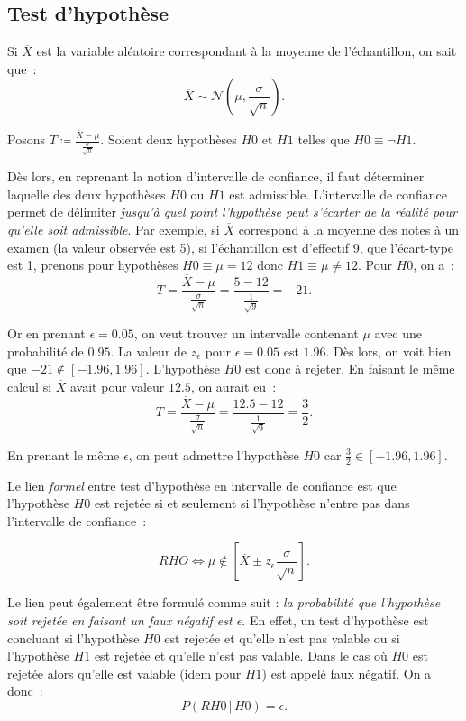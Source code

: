\documentclass{article}
\begin{document}
	\subsection{Test d'hypothèse}
		Si $\overline X$ est la variable aléatoire correspondant à la moyenne de l'échantillon, on sait que~:
		\[\overline X \sim \mathcal N\left(\mu, \frac \sigma{\sqrt n}\right).\]

		Posons $T \coloneqq \frac {\overline X - \mu}{\frac \sigma{\sqrt n}}$. Soient deux hypothèses $H0$ et $H1$ telles que $H0 \equiv \lnot H1$.

		Dès lors, en reprenant la notion d'intervalle de confiance, il faut déterminer laquelle des deux hypothèses $H0$ ou $H1$ est admissible. L'intervalle de
		confiance permet de délimiter \textit{jusqu'à quel point l'hypothèse peut s'écarter de la réalité pour qu'elle soit admissible}. Par exemple, si $\overline X$
		correspond à la moyenne des notes à un examen (la valeur observée est 5), si l'échantillon est d'effectif 9, que l'écart-type est 1, prenons pour hypothèses
		$H0 \equiv \mu = 12$  donc $H1 \equiv \mu \neq 12$. Pour $H0$, on a~:
		\[T = \frac {\overline X - \mu}{\frac \sigma{\sqrt n}} = \frac {5 - 12}{\frac 1{\sqrt 9}} = -21.\]

		Or en prenant $\epsilon = 0.05$, on veut trouver un intervalle contenant $\mu$ avec une probabilité de $0.95$. La valeur de $z_\epsilon$ pour $\epsilon = 0.05$
		est $1.96$. Dès lors, on voit bien que $-21 \not\in [-1.96, 1.96]$. L'hypothèse $H0$ est donc à rejeter. En faisant le même calcul si $\overline X$ avait pour
		valeur $12.5$, on aurait eu~:
		\[T = \frac {\overline X - \mu}{\frac \sigma{\sqrt n}} = \frac {12.5 - 12}{\frac 1{\sqrt 9}} = \frac 32.\]

		En prenant le même $\epsilon$, on peut admettre l'hypothèse $H0$ car $\frac 32 \in [-1.96, 1.96]$.

		Le lien \textit{formel} entre test d'hypothèse en intervalle de confiance est que l'hypothèse $H0$ est rejetée si et seulement si l'hypothèse n'entre pas dans
		l'intervalle de confiance~:

		\[RHO \iff \mu \not \in \left[\overline X \pm z_\epsilon \frac \sigma{\sqrt n}\right].\]

		Le lien peut également être formulé comme suit : \textit{la probabilité que l'hypothèse soit rejetée en faisant un faux négatif est $\epsilon$}. En effet, un
		test d'hypothèse est concluant si l'hypothèse $H0$ est rejetée et qu'elle n'est pas valable ou si l'hypothèse $H1$ est rejetée et qu'elle n'est pas valable. Dans
		le cas où $H0$ est rejetée alors qu'elle est valable (idem pour $H1$) est appelé faux négatif. On a donc~:
		\[P(RH0 \, | \, H0) = \epsilon.\]
\end{document}
